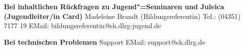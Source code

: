 \textbf{Bei inhaltlichen Rückfragen zu Jugend"=Seminaren\newline
und Juleica (Jugendleiter/in Card)}
Madeleine Brandt (Bildungsreferentin)\newline
Tel.: (04351) 7177 19\newline
EMail: bildungsreferentin@sh.dlrg-jugend.de\newline

\textbf{Bei technischen Problemen}\newline
Support\newline
EMail: support@sh.dlrg.de\newline


\newpage